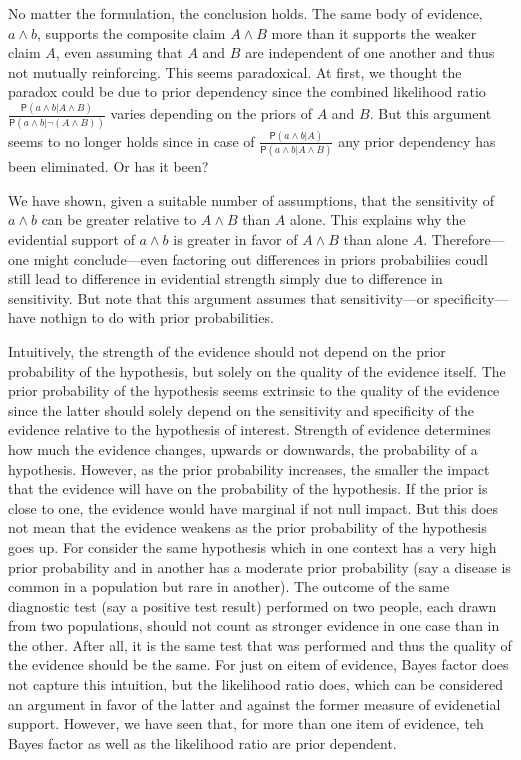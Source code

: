 \documentclass[10pt,dvipsnames,enabledeprecatedfontcommands]{scrartcl}
\newcommand{\pr}[1]{\mathsf{P}(#1)}
\begin{document}
No matter the formulation, the conclusion holds. The same body of
evidence, \(a\wedge b\), supports the composite claim \(A\wedge B\) more
than it supports the weaker claim \(A\), even assuming that \(A\) and
\(B\) are independent of one another and thus not mutually reinforcing.
This seems paradoxical. At first, we thought the paradox could be due to
prior dependency since the combined likelihood ratio
\(\frac{\pr{a\wedge b \vert A \wedge B}}{\pr{a\wedge b \vert \neg (A \wedge B)}}\)
varies depending on the priors of \(A\) and \(B\). But this argument
seems to no longer holds since in case of
\(\frac{\pr{a\wedge b \vert A}}{\pr{a\wedge b \vert A \wedge B}}\) any
prior dependency has been eliminated. Or has it been?

We have shown, given a suitable number of assumptions, that the
sensitivity of \(a\wedge b\) can be greater relative to \(A \wedge B\)
than \(A\) alone. This explains why the evidential support of
\(a\wedge b\) is greater in favor of \(A \wedge B\) than alone \(A\).
Therefore---one might conclude---even factoring out differences in
priors probabiliies coudl still lead to difference in evidential
strength simply due to difference in sensitivity. But note that this
argument assumes that sensitivity---or specificity---have nothign to do
with prior probabilities.

Intuitively, the strength of the evidence should not depend on the prior
probability of the hypothesis, but solely on the quality of the evidence
itself. The prior probability of the hypothesis seems extrinsic to the
quality of the evidence since the latter should solely depend on the
sensitivity and specificity of the evidence relative to the hypothesis
of interest. Strength of evidence determines how much the evidence
changes, upwards or downwards, the probability of a hypothesis. However,
as the prior probability increases, the smaller the impact that the
evidence will have on the probability of the hypothesis. If the prior is
close to one, the evidence would have marginal if not null impact. But
this does not mean that the evidence weakens as the prior probability of
the hypothesis goes up. For consider the same hypothesis which in one
context has a very high prior probability and in another has a moderate
prior probability (say a disease is common in a population but rare in
another). The outcome of the same diagnostic test (say a positive test
result) performed on two people, each drawn from two populations, should
not count as stronger evidence in one case than in the other. After all,
it is the same test that was performed and thus the quality of the
evidence should be the same. For just on eitem of evidence, Bayes factor
does not capture this intuition, but the likelihood ratio does, which
can be considered an argument in favor of the latter and against the
former measure of evidenetial support. However, we have seen that, for
more than one item of evidence, teh Bayes factor as well as the
likelihood ratio are prior dependent.
\end{document}
